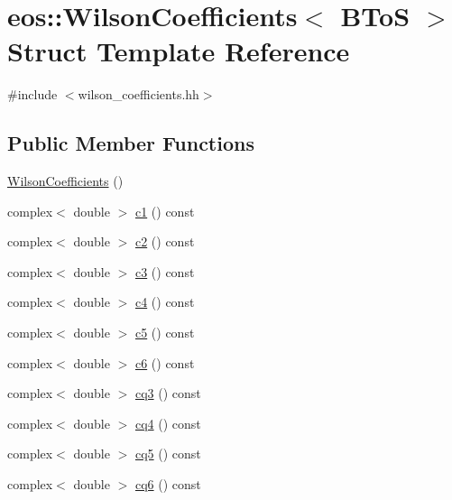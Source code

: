 \hypertarget{structeos_1_1WilsonCoefficients_3_01BToS_01_4}{
\section{eos::WilsonCoefficients$<$ BToS $>$ Struct Template Reference}
\label{structeos_1_1WilsonCoefficients_3_01BToS_01_4}
}


{\ttfamily \#include $<$wilson\_\-coefficients.hh$>$}\subsection*{Public Member Functions}
\begin{DoxyCompactItemize}
\item 
\hyperlink{structeos_1_1WilsonCoefficients_3_01BToS_01_4_addf90ab27c34f993f61e6003d34514f3}{WilsonCoefficients} ()
\item 
complex$<$ double $>$ \hyperlink{structeos_1_1WilsonCoefficients_3_01BToS_01_4_a17759f6b63cf172d7d7f07dbbb78e3f9}{c1} () const 
\item 
complex$<$ double $>$ \hyperlink{structeos_1_1WilsonCoefficients_3_01BToS_01_4_afcb665ee21ae1be28cec84c0a3781132}{c2} () const 
\item 
complex$<$ double $>$ \hyperlink{structeos_1_1WilsonCoefficients_3_01BToS_01_4_a5f36442158531e3f364f0f3cf2cadfe2}{c3} () const 
\item 
complex$<$ double $>$ \hyperlink{structeos_1_1WilsonCoefficients_3_01BToS_01_4_a427b2d73d89283266b163cfe4c42b086}{c4} () const 
\item 
complex$<$ double $>$ \hyperlink{structeos_1_1WilsonCoefficients_3_01BToS_01_4_ad68ee72fdb415820d0ff3f042a8d9e14}{c5} () const 
\item 
complex$<$ double $>$ \hyperlink{structeos_1_1WilsonCoefficients_3_01BToS_01_4_a552e58e087a6b5c4a0cec7d30486154e}{c6} () const 
\item 
complex$<$ double $>$ \hyperlink{structeos_1_1WilsonCoefficients_3_01BToS_01_4_aac9632c45e186951fe0459cb315dee0e}{cq3} () const 
\item 
complex$<$ double $>$ \hyperlink{structeos_1_1WilsonCoefficients_3_01BToS_01_4_a4e0045b6ae96dd094b9e21450fcebce2}{cq4} () const 
\item 
complex$<$ double $>$ \hyperlink{structeos_1_1WilsonCoefficients_3_01BToS_01_4_a73655ba58242bc15ecc8f097ec9abadd}{cq5} () const 
\item 
complex$<$ double $>$ \hyperlink{structeos_1_1WilsonCoefficients_3_01BToS_01_4_a454eb97a2a032d55a656e0103d4cffa7}{cq6} () const 

\end{DoxyCompactItemize}
